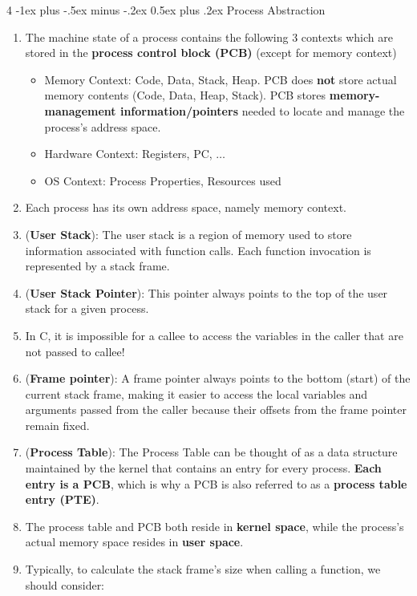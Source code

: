 \documentclass[10pt, landscape]{article}
\makeatletter
\renewcommand{\section}{\@startsection{section}{1}{0mm}%
                                {-1ex plus -.5ex minus -.2ex}%
                                {0.5ex plus .2ex}%
                                {\normalfont\large\bfseries}}
\makeatother
\begin{document}
\begin{multicols}{4}
\section{Process Abstraction}
\begin{enumerate}
    \item The machine state of a process contains the following 3 contexts which are stored in the \textbf{process control block (PCB)} (except for memory context)
    \begin{itemize}
        \item Memory Context: Code, Data, Stack, Heap. PCB does \textbf{not} store actual memory contents (Code, Data, Heap, Stack). PCB stores \textbf{memory-management information/pointers} needed to locate and manage the process's address space.
        \item Hardware Context: Registers, PC, $\dots$
        \item OS Context: Process Properties, Resources used
    \end{itemize}
    \item Each process has its own address space, namely memory context.
    \item (\textbf{User Stack}): The user stack is a region of memory used to store information associated with function calls. Each function invocation is represented by a stack frame.
    \item (\textbf{User Stack Pointer}): This pointer always points to the top of the user stack for a given process.
    \item In C, it is impossible for a callee to access the variables in the caller that are not passed to callee!
    \item (\textbf{Frame pointer}): A frame pointer always points to the bottom (start) of the current stack frame, making it easier to access the local variables and arguments passed from the caller because their offsets from the frame pointer remain fixed.
    \item (\textbf{Process Table}): The Process Table can be thought of as a data structure maintained by the kernel that contains an entry for every process. \textbf{Each entry is a PCB}, which is why a PCB is also referred to as a \textbf{process table entry (PTE)}.
    \item The process table and PCB both reside in \textbf{kernel space}, while the process's actual memory space resides in \textbf{user space}.
    \item Typically, to calculate the stack frame's size when calling a function, we should consider:

\end{enumerate}
\end{multicols}
\end{document}
